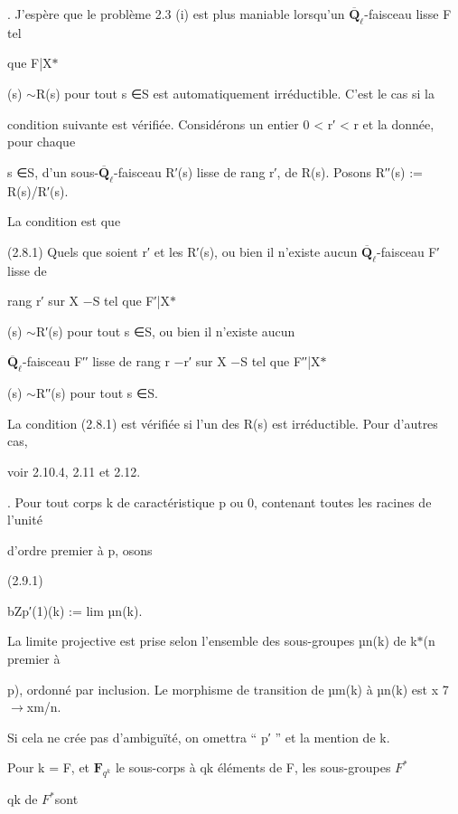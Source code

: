 \documentclass[11pt]{article}
\begin{document}
. J’espère que le problème 2.3 (i) est plus maniable lorsqu’un \(\overline{\mathbf Q}_{\ell}\)-faisceau lisse F tel\par
\noindent que F|X\(*\)\par
\noindent (s) \(\sim\)R(s) pour tout s ∈S est automatiquement irréductible. C’est le cas si la\par
\medskip
\noindent condition suivante est vérifiée. Considérons un entier 0 < r′ < r et la donnée, pour chaque\par
\noindent s ∈S, d’un sous-\(\overline{\mathbf Q}_{\ell}\)-faisceau R′(s) lisse de rang r′, de R(s). Posons R′′(s) := R(s)/R′(s).\par
\noindent La condition est que\par
\noindent (2.8.1) Quels que soient r′ et les R′(s), ou bien il n’existe aucun \(\overline{\mathbf Q}_{\ell}\)-faisceau F′ lisse de\par
\noindent rang r′ sur X −S tel que F′|X\(*\)\par
\noindent (s) \(\sim\)R′(s) pour tout s ∈S, ou bien il n’existe aucun\par
\noindent \(\overline{\mathbf Q}_{\ell}\)-faisceau F′′ lisse de rang r −r′ sur X −S tel que F′′|X\(*\)\par
\noindent (s) \(\sim\)R′′(s) pour tout s ∈S.\par
\noindent La condition (2.8.1) est vérifiée si l’un des R(s) est irréductible. Pour d’autres cas,\par
\noindent voir 2.10.4, 2.11 et 2.12.\par
{}. Pour tout corps k de caractéristique p ou 0, contenant toutes les racines de l’unité\par
\noindent d’ordre premier à p, osons\par
\noindent (2.9.1)\par
\noindent bZp′(1)(k) := lim µn(k).\par
\noindent La limite projective est prise selon l’ensemble des sous-groupes µn(k) de k\(*\)(n premier à\par
\noindent p), ordonné par inclusion. Le morphisme de transition de µm(k) à µn(k) est x 7\(\to\)xm/n.\par
\noindent Si cela ne crée pas d’ambiguïté, on omettra “ p′ ” et la mention de k.\par
\noindent Pour k = F, et \(\mathbf F_{q^k}\) le sous-corps à qk éléments de F, les sous-groupes \(F^*\)\par
\noindent qk de \(F^*\)sont\par
\end{document}

